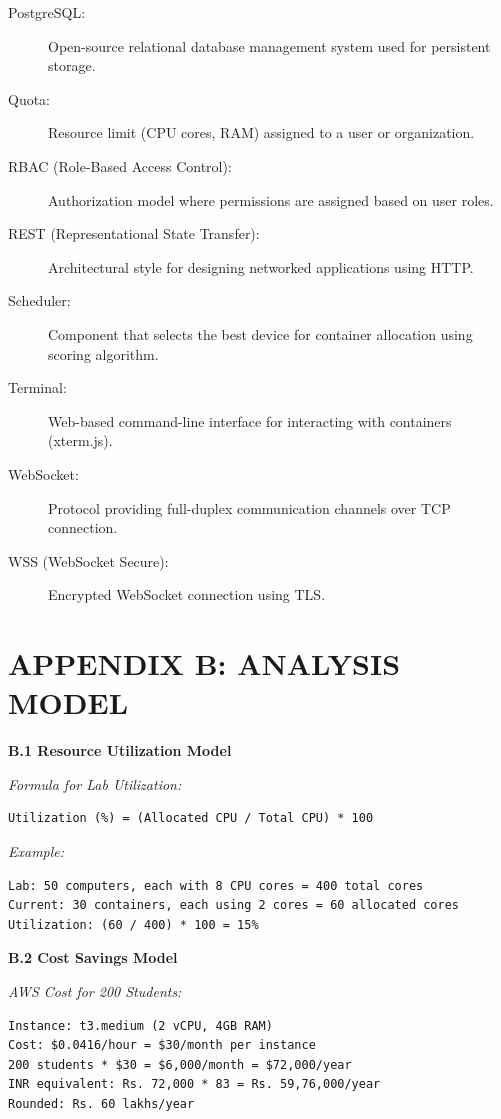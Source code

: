 \documentclass[12pt,a4paper]{article}
\begin{document}
\begin{description}
    \item[PostgreSQL:] Open-source relational database management system used for persistent storage.
    
    \item[Quota:] Resource limit (CPU cores, RAM) assigned to a user or organization.
    
    \item[RBAC (Role-Based Access Control):] Authorization model where permissions are assigned based on user roles.
    
    \item[REST (Representational State Transfer):] Architectural style for designing networked applications using HTTP.
    
    \item[Scheduler:] Component that selects the best device for container allocation using scoring algorithm.
    
    \item[Terminal:] Web-based command-line interface for interacting with containers (xterm.js).
    
    \item[WebSocket:] Protocol providing full-duplex communication channels over TCP connection.
    
    \item[WSS (WebSocket Secure):] Encrypted WebSocket connection using TLS.
\end{description}

\section*{APPENDIX B: ANALYSIS MODEL}

\textbf{B.1 Resource Utilization Model}

\textit{Formula for Lab Utilization:}
\begin{verbatim}
Utilization (%) = (Allocated CPU / Total CPU) * 100
\end{verbatim}

\textit{Example:}
\begin{verbatim}
Lab: 50 computers, each with 8 CPU cores = 400 total cores
Current: 30 containers, each using 2 cores = 60 allocated cores
Utilization: (60 / 400) * 100 = 15%
\end{verbatim}

\textbf{B.2 Cost Savings Model}

\textit{AWS Cost for 200 Students:}
\begin{verbatim}
Instance: t3.medium (2 vCPU, 4GB RAM)
Cost: $0.0416/hour = $30/month per instance
200 students * $30 = $6,000/month = $72,000/year
INR equivalent: Rs. 72,000 * 83 = Rs. 59,76,000/year
Rounded: Rs. 60 lakhs/year
\end{verbatim}
\end{document}
